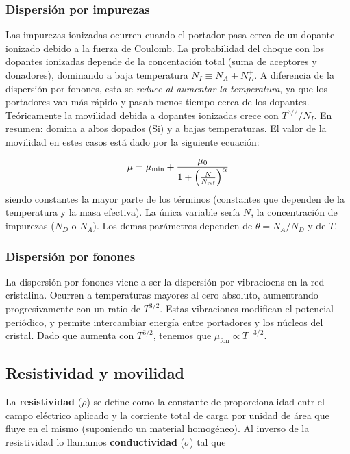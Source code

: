 \subsubsection{Dispersión por impurezas}

Las impurezas ionizadas ocurren cuando el portador pasa cerca de un dopante ionizado debido a la fuerza de Coulomb. La probabilidad del choque con los dopantes ionizadas depende de la concentación total (suma de aceptores y donadores), dominando a baja temperatura $N_I \equiv N_A^- + N_D^+$. A diferencia de la dispersión por fonones, esta se \textit{reduce al aumentar la temperatura}, ya que los portadores van más rápido y pasab menos tiempo cerca de los dopantes. Teóricamente la movilidad debida a dopantes ionizadas crece con $T^{3/2}/N_I$. En resumen: domina a altos dopados (Si) y a bajas temperaturas. El valor de la movilidad en estes casos está dado por la siguiente ecuación: 

\begin{equation}
	\mu = \mu_{\min} + \frac{\mu_0}{1+\left( \frac{N}{N_{\text{ref}}} \right)^{\alpha}}  
\end{equation}
siendo constantes la mayor parte de los términos (constantes que dependen de la temperatura y la masa efectiva). La única variable sería $N$, la concentración de impurezas ($N_D$ o $N_A$). Los demas parámetros dependen de $\theta=N_A/N_D$ y de $T$.

\subsubsection{Dispersión por fonones}

La dispersión por fonones viene a ser la dispersión por vibracioens en la red cristalina. Ocurren a temperaturas mayores al cero absoluto, aumentrando progresivamente con un ratio de $T^{3/2}$. Estas vibraciones modifican el potencial periódico, y permite intercambiar energía entre portadores y los núcleos del cristal. Dado que aumenta con $T^{3/2}$, tenemos que $\mu_{\text{fon}} \propto T^{-3/2}$.


\subsection{Resistividad y movilidad}

La \textbf{resistividad} ($\rho$) se define como la constante de proporcionalidad entr el campo eléctrico aplicado y la corriente total de carga por unidad de área que fluye en el mismo (suponiendo un material homogéneo). Al inverso de la resistividad lo llamamos \textbf{conductividad} ($\sigma$) tal que

